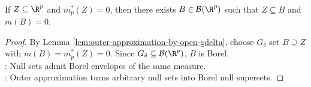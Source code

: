 \begin{corollary} \label{cor:null-sets-in-borel-null-sets} \\
If $Z\subseteq\R^p$ and $m_p^\ast(Z)=0$, then there exists $B\in\mathcal{B}(\R^p)$ such that $Z\subseteq B$ and $m(B)=0$.
\begin{proof}
By Lemma \ref{lem:outer-approximation-by-open-gdelta}, choose $G_\delta$ set $B\supseteq Z$ with $m(B)=m_p^\ast(Z)=0$. Since $G_\delta\subseteq\mathcal{B}(\R^p)$, $B$ is Borel.\\
: Null sets admit Borel envelopes of the same measure.\\
: Outer approximation turns arbitrary null sets into Borel null supersets.
\end{proof}
\end{corollary}

